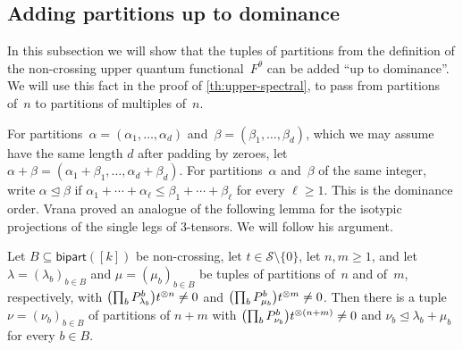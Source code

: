 \documentclass[11pt,letterpaper]{article}
\newcommand{\bipart}{\mathsf{bipart}}
\begin{document}
\subsection{Adding partitions up to dominance}\label{sec:upper-dominance}
In this subsection we will show that the tuples of partitions from the definition of the non-crossing upper quantum functional~$F^\theta$ can be added ``up to dominance''. We will use this fact in the proof of \cref{th:upper-spectral}, to pass from partitions of~$n$ to partitions of multiples of~$n$.

For partitions~$\alpha = (\alpha_1, \ldots, \alpha_d)$ and~$\beta = (\beta_1, \ldots, \beta_d)$, which we may assume have the same length $d$ after padding by zeroes, let $\alpha + \beta = (\alpha_1 + \beta_1, \ldots, \alpha_d + \beta_d)$. For partitions~$\alpha$ and~$\beta$ of the same integer, write $\alpha \unlhd \beta$ if $\alpha_1 + \cdots + \alpha_\ell \leq \beta_1 + \cdots + \beta_\ell$ for every $\ell \geq 1$. This is the dominance order. Vrana \cite[Proposition~5.10]{vrana2025errorexponentstripartitetobipartiteentanglement} proved an analogue of the following lemma for the isotypic projections of the single legs of $3$-tensors. We will follow his argument.
\begin{lemma}\label{lem:dominance}
Let $B \subseteq \bipart([k])$ be non-crossing, let $t \in \mathcal{S} \setminus \{0\}$, let $n, m \geq 1$, and let $\lambda = (\lambda_b)_{b \in B}$ and $\mu = (\mu_b)_{b \in B}$ be tuples of partitions of~$n$ and of~$m$, respectively, with $\bigl( \prod_b P^b_{\smash{\lambda_b}} \bigr) t^{\otimes n} \neq 0$ and $\bigl( \prod_b P^b_{\smash{\mu_b}} \bigr) t^{\otimes m} \neq 0$. Then there is a tuple $\nu = (\nu_b)_{b \in B}$ of partitions of $n+m$ with $\bigl( \prod_b P^b_{\nu_b} \bigr) t^{\smash{\otimes (n+m)}} \neq 0$ and $\nu_b \unlhd \lambda_b + \mu_b$ for every $b \in B$.
\end{lemma}
\end{document}
